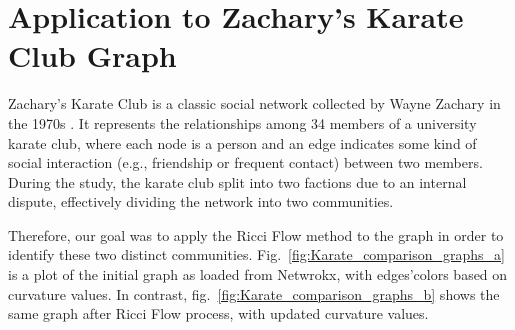 \section{Application to Zachary's Karate Club Graph}
\label{sec5.3}

Zachary’s Karate Club is a classic social network collected by Wayne Zachary in the 1970s \cite{ZacharyKarateClubGraph}. It represents the relationships among 34 members of a university karate club, where each node is a person and an edge indicates some kind of social interaction (e.g., friendship or frequent contact) between two members. During the study, the karate club split into two factions due to an internal dispute, effectively dividing the network into two communities.

Therefore, our goal was to apply the Ricci Flow method to the graph in order to identify these two distinct communities.
Fig.~\ref{fig:Karate_comparison_graphs_a} is a plot of the initial graph as loaded from Netwrokx, with edges'colors based on curvature values. In contrast, fig.~\ref{fig:Karate_comparison_graphs_b} shows the same graph after Ricci Flow process, with updated curvature values. 
